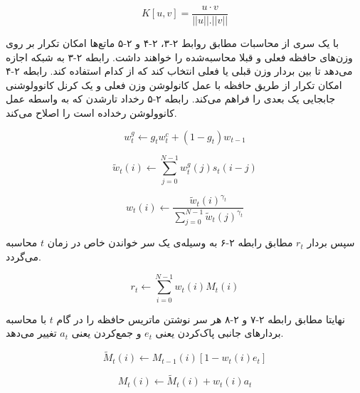 \begin{equation}
K[u, v] = \frac{u·v}{||u||.||v||} 
\end{equation}

با یک سری از محاسبات مطابق روابط ۲-۳، ۲-۴ و ۲-۵ ماتع‌ها امکان تکرار بر روی وزن‌های حافظه فعلی و قبلا محاسبه‌شده را خواهند داشت. رابطه ۲-۳ به شبکه اجازه می‌دهد تا بین بردار وزن قبلی یا فعلی انتخاب کند که از کدام استفاده کند. رابطه ۲-۴ امکان تکرار از طریق حافظه با عمل کانولوشن وزن فعلی و یک کرنل کانوولوشنی جابجایی یک بعدی را فراهم می‌کند. رابطه ۲-۵ رخداد تارشدن که به واسطه عمل کانوولوشن رخداده است را اصلاح می‌کند.


\begin{equation}
w^g_t \leftarrow g_t w^c_t + (1 − g_t)w_{t−1}
\end{equation}

\begin{equation}
\tilde{w}_t(i) \leftarrow \sum^{N-1}_{j=0} w^g_t(j)s_t(i − j)
\end{equation}

\begin{equation}
w_t(i) \leftarrow \frac{\tilde{w}_t(i)^{\gamma_t}}{\sum_{j=0}^{N-1}\tilde{w}_t(j)^{\gamma_t}}
\end{equation}

سپس بردار $r_t$ مطابق رابطه ۲-۶ به وسیله‌ی یک سر خواندن خاص در زمان $t$ محاسبه می‌گردد.

\begin{equation}
r_t \leftarrow \sum_{i=0}^{N-1} w_t(i)M_t(i)
\end{equation}

نهایتا مطابق رابطه ۲-۷ و ۲-۸ هر سر نوشتن ماتریس حافظه را در گام $t$ با محاسبه بردارهای جانبی پاک‌کردن یعنی $e_t$ و جمع‌‌کردن یعنی $a_t$ تغییر می‌دهد.

\begin{equation}
\tilde{M}_t(i) \leftarrow M_{t-1}(i)[1-w_t(i)e_t]
\end{equation}

\begin{equation}
M_t(i) \leftarrow \tilde{M}_t(i) + w_t(i)a_t
\end{equation}